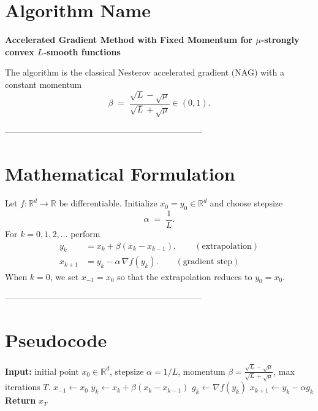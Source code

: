 \documentclass{article}
\newcommand{\grad}{\nabla}
\begin{document}
\section*{Algorithm Name}
\textbf{Accelerated Gradient Method with Fixed Momentum for $\mu$‑strongly convex $L$‑smooth functions}  

The algorithm is the classical Nesterov accelerated gradient (NAG) with a constant momentum
\[
\beta \;=\; \frac{\sqrt{L}-\sqrt{\mu}}{\sqrt{L}+\sqrt{\mu}} \in (0,1).
\]

---------------------------------------------------------------------

\section*{Mathematical Formulation}
Let $f:\mathbb R^{d}\to\mathbb R$ be differentiable.  
Initialize $x_{0}=y_{0}\in\mathbb R^{d}$ and choose stepsize
\[
\alpha \;=\; \frac{1}{L}.
\]
For $k=0,1,2,\dots$ perform
\begin{align}
y_{k}      &= x_{k}+ \beta (x_{k}-x_{k-1}), \qquad (\text{extrapolation})\label{eq:extrap}\\
x_{k+1}    &= y_{k} - \alpha \,\grad f(y_{k}) .\qquad (\text{gradient step})\label{eq:update}
\end{align}
When $k=0$, we set $x_{-1}=x_{0}$ so that the extrapolation reduces to $y_{0}=x_{0}$.

---------------------------------------------------------------------

\section*{Pseudocode}
\begin{algorithm}[H]
\caption{Accelerated Gradient with Fixed Momentum}
\begin{algorithmic}[1]
\State \textbf{Input:} initial point $x_{0}\in\mathbb R^{d}$, stepsize $\alpha=1/L$, momentum $\beta=\frac{\sqrt{L}-\sqrt{\mu}}{\sqrt{L}+\sqrt{\mu}}$, max iterations $T$.
\State $x_{-1}\gets x_{0}$ 
    \State $y_{k}\gets x_{k}+ \beta (x_{k}-x_{k-1})$ 
    \State $g_{k}\gets \grad f(y_{k})$
    \State $x_{k+1}\gets y_{k} - \alpha g_{k}$ 
\EndFor
\State \textbf{Return} $x_{T}$
\end{algorithmic}
\end{algorithm}
\end{document}
